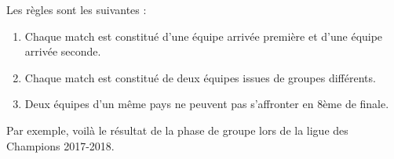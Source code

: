\documentclass{../ficheTDTP}
\begin{document}
Les règles sont les suivantes :

\begin{enumerate}
\item Chaque match est constitué d'une équipe arrivée première et d'une équipe arrivée seconde.
\label{cond:ordre}
\item Chaque match est constitué de deux équipes issues de groupes différents.
\label{cond:groupe}
\item Deux équipes d'un même pays ne peuvent pas s'affronter en 8ème de finale.
\label{cond:pays}
\end{enumerate}

Par exemple, voilà le résultat de la phase de groupe lors de la ligue des Champions 2017-2018.

\vspace{0.5cm}
\end{document}
